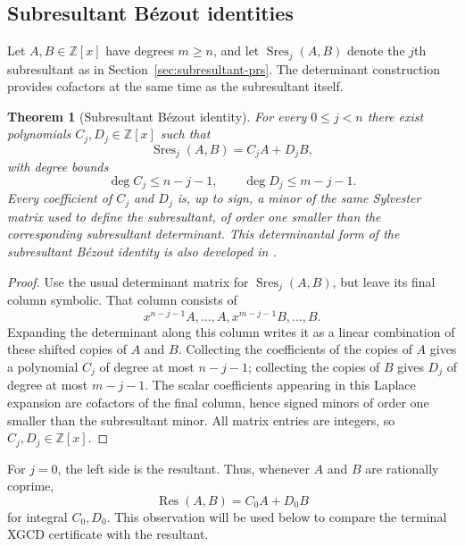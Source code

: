 \documentclass[11pt]{book}
\newtheorem{theorem}{Theorem}[section]
\theoremstyle{definition}
\newcommand{\ZZ}{\mathbb Z}
\begin{document}
\subsection{Subresultant B\'ezout identities}

Let $A,B\in\ZZ[x]$ have degrees $m\ge n$, and let
$\operatorname{Sres}_j(A,B)$ denote the $j$th subresultant as in
Section~\ref{sec:subresultant-prs}.  The determinant construction provides
cofactors at the same time as the subresultant itself.

\begin{theorem}[Subresultant B\'ezout identity]
\label{thm:subresultant-bezout}
For every $0\le j<n$ there exist polynomials
$C_j,D_j\in\ZZ[x]$ such that
\begin{equation}\label{eq:subresultant-bezout}
 \operatorname{Sres}_j(A,B)=C_jA+D_jB,
\end{equation}
with degree bounds
\begin{equation}\label{eq:subresultant-bezout-degrees}
 \deg C_j\le n-j-1,
 \qquad
 \deg D_j\le m-j-1.
\end{equation}
Every coefficient of $C_j$ and $D_j$ is, up to sign, a minor of the same
Sylvester matrix used to define the subresultant, of order one smaller than
the corresponding subresultant determinant.  This determinantal form of the
subresultant B\'ezout identity is also developed in \cite{ElKahoui2003}.
\end{theorem}

\begin{proof}
Use the usual determinant matrix for
$\operatorname{Sres}_j(A,B)$, but leave its final column symbolic.  That
column consists of
\[
 x^{n-j-1}A,\ldots,A,
 x^{m-j-1}B,\ldots,B.
\]
Expanding the determinant along this column writes it as a linear combination
of these shifted copies of $A$ and $B$.  Collecting the coefficients of the
copies of $A$ gives a polynomial $C_j$ of degree at most $n-j-1$; collecting
the copies of $B$ gives $D_j$ of degree at most $m-j-1$.  The scalar
coefficients appearing in this Laplace expansion are cofactors of the final
column, hence signed minors of order one smaller than the subresultant
minor.  All matrix entries are integers, so $C_j,D_j\in\ZZ[x]$.
\end{proof}

For $j=0$, the left side is the resultant.  Thus, whenever $A$ and $B$ are
rationally coprime,
\begin{equation}\label{eq:resultant-bezout}
 \operatorname{Res}(A,B)=C_0A+D_0B
\end{equation}
for integral $C_0,D_0$.  This observation will be used below to compare the
terminal XGCD certificate with the resultant.
\end{document}
